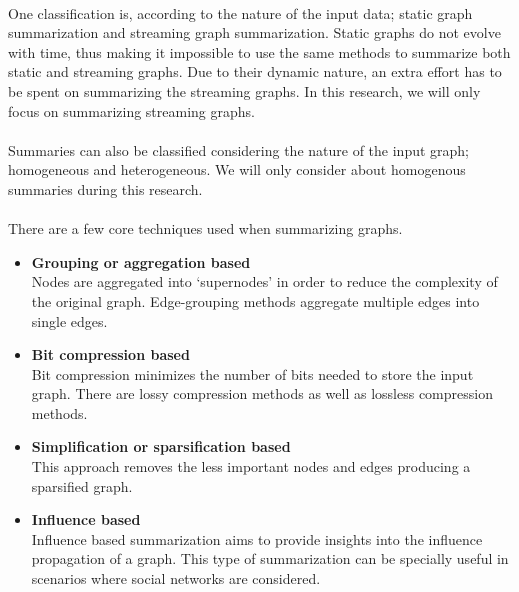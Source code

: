 \paragraph{}
One classification is, according to the nature of the input data; static graph summarization and streaming graph summarization. Static graphs do not evolve with time, thus making it impossible to use the same methods to summarize both static and streaming graphs. Due to their dynamic nature, an extra effort has to be spent on summarizing the streaming graphs. In this research, we will only focus on summarizing streaming graphs.

\paragraph{}
Summaries can also be classified considering the nature of the input graph; homogeneous and heterogeneous. We will only consider about homogenous summaries during this research.

\paragraph{}
There are a few core techniques used when summarizing graphs\cite{liu_graph_2018}.

\begin{itemize}
    \item \textbf{Grouping or aggregation based}\\
          Nodes are aggregated into ‘supernodes’ in order to reduce the complexity of the original graph. Edge-grouping methods aggregate multiple edges into single edges.

    \item \textbf{Bit compression based}\\
          Bit compression minimizes the number of bits needed to store the input graph. There are lossy compression methods as well as lossless compression methods.

    \item \textbf{Simplification or sparsification based}\\
          This approach removes the less important nodes and edges producing a sparsified graph.

    \item \textbf{Influence based}\\
          Influence based summarization aims to provide insights into the influence propagation of a graph. This type of summarization can be specially useful in scenarios where social networks are considered.
\end{itemize}

